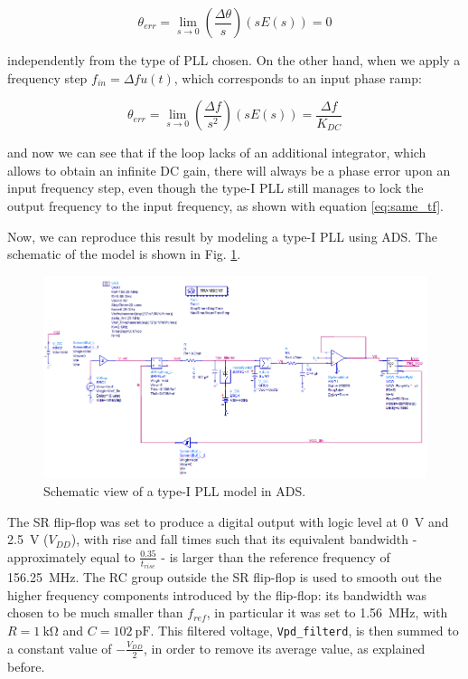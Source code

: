 \documentclass[lettersize,journal]{IEEEtran}
\begin{document}
\begin{equation}\label{eq:err_phase_step}
    \theta_{err}=\underset{s\to 0}{\lim}\left(\frac{\Delta\theta}{s}\right)\left(sE(s)\right)=0
\end{equation}

independently from the type of PLL chosen.
On the other hand, when we apply a frequency step $f_{in}=\Delta f u(t)$, which corresponds to an input phase ramp:

\begin{equation}\label{eq:err_freq_step}
    \theta_{err}=\underset{s\to 0}{\lim}\left(\frac{\Delta f}{s^2}\right)\left(sE(s)\right)=\frac{\Delta f}{K_{DC}}
\end{equation}

and now we can see that if the loop lacks of an additional integrator, which allows to obtain an infinite DC gain, there will always be a phase error upon an input frequency step, even though the type-I PLL still manages to lock the output frequency to the input frequency, as shown with equation \ref{eq:same_tf}.

\medskip
Now, we can reproduce this result by modeling a type-I PLL using ADS. The schematic of the model is shown in Fig. \ref{fig:type_one_ads_model}.

\begin{figure}[!ht]
    \centering
    \includegraphics[width=1\linewidth]{images/type_one_pll/ADS_schematic.png}
    \caption{Schematic view of a type-I PLL model in ADS.}
    \label{fig:type_one_ads_model}
\end{figure}

The SR flip-flop was set to produce a digital output with logic level at \qty{0}{\volt} and \qty{2.5}{\volt} ($V_{DD}$), with rise and fall times such that its equivalent bandwidth - approximately equal to $\frac{0.35}{t_{rise}}$ - is larger than the reference frequency of \qty{156.25}{\mega\hertz}. The RC group outside the SR flip-flop is used to smooth out the higher frequency components introduced by the flip-flop: its bandwidth was chosen to be much smaller than $f_{ref}$, in particular it was set to \qty{1.56}{\mega\hertz}, with $R=\qty{1}{\kilo\ohm}$ and $C=\qty{102}{\pico\farad}$. This filtered voltage, \texttt{Vpd\_filterd}, is then summed to a constant value of $-\frac{V_{DD}}{2}$, in order to remove its average value, as explained before.
\end{document}
